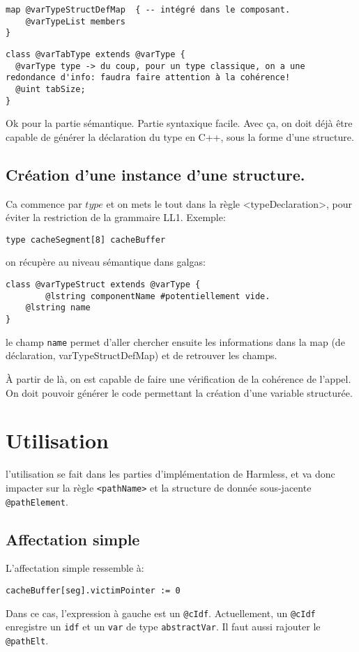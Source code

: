 \documentclass[11pt]{article}
\begin{document}
\begin{verbatim}
map @varTypeStructDefMap  { -- intégré dans le composant.
	@varTypeList members
}
\end{verbatim}

\begin{verbatim}
class @varTabType extends @varType {
  @varType type -> du coup, pour un type classique, on a une redondance d'info: faudra faire attention à la cohérence!
  @uint tabSize;
}
\end{verbatim}

Ok pour la partie sémantique. Partie syntaxique facile. 
Avec ça, on doit déjà être capable de générer la déclaration du type en C++, sous la forme d'une structure.

\subsection{Création d'une instance d'une structure.}

Ca commence par \texttt{$type$} et on mets le tout dans la règle <typeDeclaration>, pour éviter la restriction de la grammaire LL1. Exemple:
\begin{lstlisting}
type cacheSegment[8] cacheBuffer
\end{lstlisting}

on récupère au niveau sémantique dans galgas:

\begin{verbatim}
class @varTypeStruct extends @varType {
        @lstring componentName #potentiellement vide.
	@lstring name
}
\end{verbatim}

le champ \texttt{name} permet d'aller chercher ensuite les informations dans la map (de déclaration, varTypeStructDefMap) et de retrouver les champs.

À partir de là, on est capable de faire une vérification de la cohérence de l'appel. On doit pouvoir générer le code permettant la création d'une variable structurée.

\section{Utilisation}
l'utilisation se fait dans les parties d'implémentation de Harmless, et va donc impacter sur la règle \texttt{<pathName>} et la structure de donnée sous-jacente \texttt{@pathElement}.

\subsection{Affectation simple}
L'affectation simple ressemble à:
\begin{lstlisting}
cacheBuffer[seg].victimPointer := 0
\end{lstlisting}
Dans ce cas, l'expression à gauche est un \texttt{@cIdf}. Actuellement, un  \texttt{@cIdf} enregistre un \texttt{idf} et un \texttt{var} de type \texttt{abstractVar}. Il faut aussi rajouter le \texttt{@pathElt}.
\end{document}
